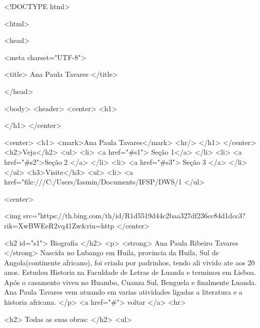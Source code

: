 

<!DOCTYPE html>

<html>
       
 <head>
           
    <meta charset="UTF-8">
        
       <title> Ana Paula Tavares </title>
    
    </head>
     
   <body>
   <header>
      <center>
      <h1>
       
       </h1>
      </center>
   
    <center>
      <h1>
        <mark>Ana Paula Tavares</mark> 
   <hr/>
      </h1>
  </center>
    <h2>Veja</h2>
    <ul>
      <li> <a href="#s1"> Seção 1</a> </li>
      <li> <a href="#s2">Seção 2 </a> </li>
      <li> <a href="#s3"> Seção 3 </a> </li>
    </ul>
    <h3>Visite</h3>
  <ul> 
    <li> <a href="file:///C:/Users/Iasmin/Documents/IFSP/DWS/1%
	</ul>

    <center>  

  <img src="https://th.bing.com/th/id/R1d5519d44c2baa327df236cc84d1dcc3?rik=XwBWEeR2vq41Zw&riu=http%
      </center>
 

    <h2 id="s1"> Biografia </h2>
 <p>
  <strong> Ana Paula Ribeiro Tavares  </strong> Nascida no Lubango em Huila, provincia da Huila, Sul de Angola(continente africano), foi criada por padrinhos, tendo ali vivido ate aos 20 anos.
  Estudou Historia na Faculdade de Letras de Luanda e terminou em Lisboa. Após o casamento viveu no Huambo, Cuanza Sul, Benguela e finalmente Luanda. Ana Paula Tavares vem atuando em varias atividades ligadas a literatura e a historia africana. 
     </p>
	  <a href="#"> voltar </a>
	  <hr>
	  

    <h2>   Todas as suas obras: </h2>
  <ul> 

